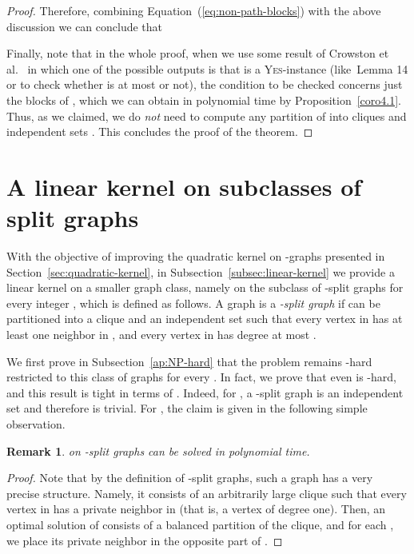 \documentclass[
final
]{dmtcs-episciences}
\newtheorem{remark}{Remark}{\bfseries}{\itshape}
\begin{document}
\begin{proof}
Therefore, combining Equation~(\ref{eq:non-path-blocks}) with the above discussion we can conclude that

Finally, note that in the whole proof, when we use some result of Crowston et al.~\cite{crowston2013maximum} in which one of the possible outputs is that  is a \textsc{Yes}-instance (like~Lemma 14 or to check whether  is at most  or not), the condition to be checked concerns just the blocks of , which we can obtain in polynomial time by Proposition~\ref{coro4.1}. Thus, as we claimed, we do {\sl not} need to compute any partition of  into cliques   and independent sets . This concludes the proof of the theorem.\end{proof}



\section{A linear kernel on subclasses of split graphs}
\label{sec:linear-kernel}





With the objective of improving the quadratic kernel on -graphs presented in Section~\ref{sec:quadratic-kernel}, in Subsection~\ref{subsec:linear-kernel} we provide a linear kernel on a smaller graph class, namely on the subclass of -split graphs for every integer , which is defined as follows. A graph  is a \emph{-split graph} if  can be partitioned into a clique  and an independent set  such that every vertex in  has at least one neighbor in , and every vertex in  has degree at most .




We first prove in Subsection~\ref{ap:NP-hard} that the problem remains {}-hard restricted to this class of graphs for every . In fact, we prove that even {} is {}-hard, and this result is tight in terms of . Indeed, for , a -split graph is an independent set and therefore {} is trivial. For , the claim is given in the following simple observation.

\begin{remark}{} on -split graphs can be solved in polynomial time.
\end{remark}
\begin{proof} Note that by the definition of  -split graphs, such a graph has a very precise structure. Namely, it consists of an arbitrarily large clique  such that every vertex  in  has a private neighbor  in  (that is, a vertex of degree one). Then, an optimal solution of {} consists of a balanced partition of the clique, and for each , we place its private neighbor  in the opposite part of .
\end{proof}
\end{document}
